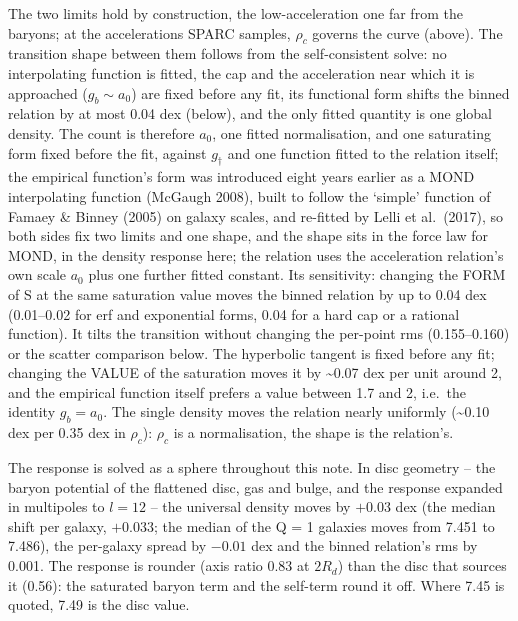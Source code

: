 \documentclass[
  10pt,
]{article}
\begin{document}
The two limits hold by construction, the low-acceleration one far from the baryons; at the accelerations SPARC samples, $\rho_c$ governs the curve (above). The transition shape between them follows from the self-consistent solve: no interpolating function is fitted, the cap and the acceleration near which it is approached ($g_b\sim a_0$) are fixed before any fit, its functional form shifts the binned relation by at most 0.04 dex (below), and the only fitted quantity is one global density. The count is therefore $a_0$, one fitted normalisation, and one saturating form fixed before the fit, against $g_\dagger$ and one function fitted to the relation itself; the empirical function's form was introduced eight years earlier as a MOND interpolating function (McGaugh 2008), built to follow the `simple' function of Famaey \& Binney (2005) on galaxy scales, and re-fitted by Lelli et al.~(2017), so both sides fix two limits and one shape, and the shape sits in the force law for MOND, in the density response here; the relation uses the acceleration relation's own scale $a_0$ plus one further fitted constant. Its sensitivity:
changing the FORM of S at the same saturation value moves the binned relation by up to 0.04 dex (0.01--0.02 for erf and exponential forms, 0.04 for a hard cap or a rational function). It tilts the transition without changing the per-point rms (0.155--0.160) or the scatter comparison below. The hyperbolic tangent is fixed before any fit;
changing the VALUE of the saturation moves it by \textasciitilde{}0.07 dex
per unit around 2, and the empirical function itself prefers
a value between 1.7 and 2, i.e.\ the identity $g_b=a_0$. The single
density moves the relation nearly uniformly (\textasciitilde{}0.10 dex per
0.35 dex in $\rho_c$): $\rho_c$ is a normalisation, the shape is the relation's.

The response is solved as a sphere throughout this note. In disc geometry -- the baryon potential of the flattened disc, gas and bulge, and the response expanded in multipoles to $l=12$ -- the universal density moves by $+0.03$ dex (the median shift per galaxy, $+0.033$; the median of the Q = 1 galaxies moves from 7.451 to 7.486), the per-galaxy spread by $-0.01$ dex and the binned relation's rms by 0.001. The response is rounder (axis ratio 0.83 at $2R_d$) than the disc that sources it (0.56): the saturated baryon term and the self-term round it off. Where 7.45 is quoted, 7.49 is the disc value.
\end{document}
